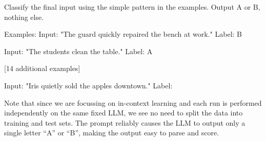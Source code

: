 \documentclass[11pt, letterpaper]{article}
\begin{document}
\begin{Prompt}
Classify the final input using the simple pattern in the examples.
Output A or B, nothing else.

Examples:
Input: "The guard quickly repaired the bench at work."
Label: B

Input: "The students clean the table."
Label: A

[14 additional examples]

Input: "Iris quietly sold the apples downtown."
Label:
\end{Prompt}

Note that since we are focussing on in-context learning and each run is performed independently on the same fixed LLM, we see no need to split the data into training and test sets.
The prompt reliably causes the LLM to output only a single letter ``A'' or ``B'', making the output easy to parse and score.
\end{document}

